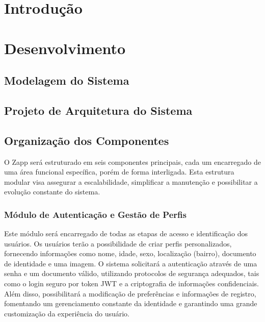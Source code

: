 \documentclass[a5paper, 12pt]{article}
\begin{document}


\newpage
\section{Introdução}
\newpage
\section{Desenvolvimento}

\subsection{Modelagem do Sistema}

\subsection{Projeto de Arquitetura do Sistema}

\subsection{Organização dos Componentes}

O Zapp será estruturado em seis componentes principais, cada um encarregado de uma área funcional específica, porém de forma interligada.  Esta estrutura modular visa assegurar a escalabilidade, simplificar a manutenção e possibilitar a evolução constante do sistema.

\subsubsection{Módulo de Autenticação e Gestão de Perfis}

Este módulo será encarregado de todas as etapas de acesso e identificação dos usuários.  Os usuários terão a possibilidade de criar perfis personalizados, fornecendo informações como nome, idade, sexo, localização (bairro), documento de identidade e uma imagem.  O sistema solicitará a autenticação através de uma senha e um documento válido, utilizando protocolos de segurança adequados, tais como o login seguro por token JWT e a criptografia de informações confidenciais.  Além disso, possibilitará a modificação de preferências e informações de registro, fomentando um gerenciamento constante da identidade e garantindo uma grande customização da experiência do usuário.
\end{document}
